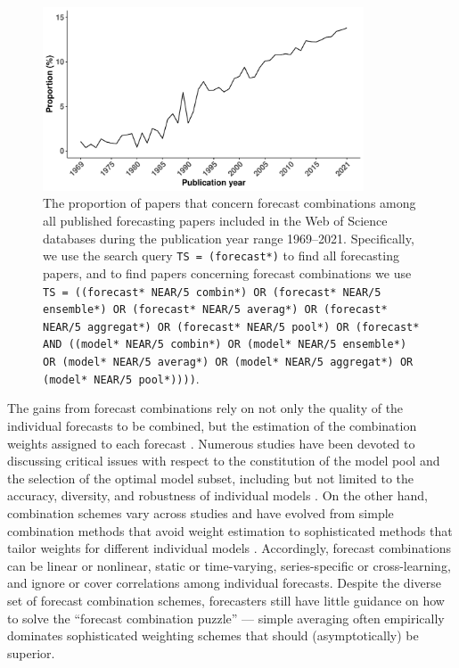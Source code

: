 \documentclass[a4paper,11pt]{article}
\begin{document}
\begin{figure}[!htb]
  \centering \includegraphics[width=0.85\textwidth]{prop}
  \caption{The proportion of papers that concern forecast combinations among all published forecasting papers included in the Web of Science databases during the publication year range 1969--2021. Specifically, we use the search query \texttt{TS = (forecast*)} to find all forecasting papers, and to find papers concerning forecast combinations we use \texttt{TS = ((forecast* NEAR/5 combin*) OR (forecast* NEAR/5 ensemble*) OR (forecast* NEAR/5 averag*) OR (forecast* NEAR/5 aggregat*) OR (forecast* NEAR/5 pool*) OR (forecast* AND ((model* NEAR/5 combin*) OR (model* NEAR/5 ensemble*) OR (model* NEAR/5 averag*) OR (model* NEAR/5 aggregat*) OR (model* NEAR/5 pool*))))}.}
  \label{fig:prop}
\end{figure}

The gains from forecast combinations rely on not only the quality of the individual forecasts to be combined, but the estimation of the combination weights assigned to each forecast \citep{Timmermann2006-en,Cang2014-tp}. Numerous studies have been devoted to discussing critical issues with respect to the constitution of the model pool and the selection of the optimal model subset, including but not limited to the accuracy, diversity, and robustness of individual models \citep{Batchelor1995-ps,Mannes2014-dl,Thomson2019-al,Lichtendahl2020-ut,Kang2021-ol}. On the other hand, combination schemes vary across studies and have evolved from simple combination methods that avoid weight estimation \citep[e.g.,][]{Clemen1986-pd,Palm1992-im,Genre2013-ut,Grushka-Cockayne2017-dj,Petropoulos2020-fp} to sophisticated methods that tailor weights for different individual models \citep[e.g.,][]{Bates1969-yj,Newbold1974-lp,Kolassa2011-ai,Li2020-od,Montero-Manso2020-tq,Kang2021-ol,Wang2021-un}. Accordingly, forecast combinations can be linear or nonlinear, static or time-varying, series-specific or cross-learning, and ignore or cover correlations among individual forecasts. Despite the diverse set of forecast combination schemes, forecasters still have little guidance on how to solve the ``forecast combination puzzle'' \citep{Stock2004-rq,Smith2009-wd,Claeskens2016-pv,Chan2018-jl} --- simple averaging often empirically dominates sophisticated weighting schemes that should (asymptotically) be superior.
\end{document}
